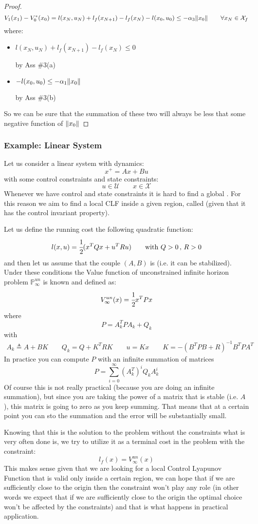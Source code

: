 \begin{proof}
\[V_1(x_1) - V_0^*(x_0)  = l(x_N, u_N) + l_f(x_{N+1}) - l_f(x_N) - l(x_0, u_0) \le -\alpha_3 \lVert x_0\rVert\qquad \forall x_N\in\mathcal{X}_f\]
where:
\begin{itemize}
\item $l(x_N, u_N) + l_f(x_{N+1}) - l_f(x_N) \le 0$ 

by Ass \#3(a)
\item $- l(x_0, u_0) \le -\alpha_1\lVert x_0\rVert$

by Ass \#3(b)
\end{itemize}
So we can be sure that the summation of these two will always be less that some negative function of $\lVert x_0\rVert$
\end{proof}

\subsubsection{Example: Linear System}
Let us consider a linear system with dynamics:
\[x^+ = Ax + Bu\]
with some control constraints and state constraints:
\[u\in\mathcal{U} \qquad x\in\mathcal{X}\]
Whenever we have control and state constraints it is hard to find a global .
For this reason we aim to find a local CLF inside a given region, called  (given that it has the control invariant property).

Let us define the running cost the following quadratic function:
\[l(x,u) = \cfrac{1}{2} (x^TQx + u^TRu)\qquad\text{with } Q>0\,,\,R>0\] 
and then let us assume that the couple $(A, B)$ is  (i.e. it can be stabilized).
Under these conditions the Value function of unconstrained infinite horizon problem $\mathbb{P}_{\infty}^{un}$ is known and defined as:
\[V_{\infty}^{un}(x) = \cfrac{1}{2}x^TPx\]
where 
\[P =A_k^T P A_k + Q_k\]
with
\begin{gather*}
A_k\triangleq A+BK\qquad Q_k=Q+K^TRK \qquad u=Kx \qquad K=-(B^TPB+R)^{-1}B^TPA^T
\end{gather*}
In practice you can compute $P$ with an infinite summation of matrices
\[P = \sum_{i=0}^{\infty} (A_k^T)^iQ_kA_k^i\]
Of course this is not really practical (because you are doing an infinite summation), but since you are taking the power of a matrix that is stable (i.e. $A$), this matrix is going to zero as you keep summing. That means that at a certain point you can sto the summation and the error will be substantially small.

Knowing that this is the solution to the problem without the constraints what is  very often done is, we try to utilize it as a terminal cost in the problem with the constraint:
\[l_f(x) = V_{\infty}^{un}(x)\]
This makes sense given that we are looking for a local Control Lyapunov Function that is valid only inside a certain region, we can hope that if we are sufficiently close to the origin then the constraint won't play any role (in other words we expect that if we are sufficiently close to the origin the optimal choice won't be affected by the constraints) and that is what happens in practical application.

